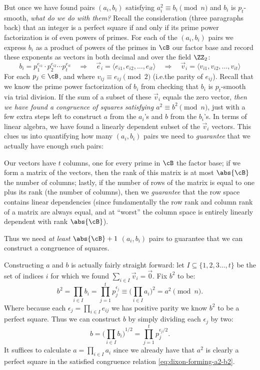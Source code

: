 \documentclass{report}
\begin{document}
But once we have found pairs $(a_i,b_i)$ satisfying $a_i^2\equiv b_i\pmod n$ and $b_i$ is
$p_t$-smooth, \emph{what do we do with them?} Recall the consideration (three paragraphs back) that
an integer is a perfect square if and only if its prime power factorization is of even powers of
primes. For each of the $(a_i,b_i)$ pairs we express $b_i$ as a product of powers of the primes in
$\cB$ our factor base and record these exponents as vectors in both decimal and over the field
$\ZZ_2$:
\begin{equation}
    b_i = p_1^{e_{i1}}\cdot p_2^{e_{i2}}\cdots p_t^{e_{it}}
    \quad\Rightarrow\quad
    \vec e_i = \langle e_{i1},e_{i2},\ldots,e_{it}\rangle
    \quad\Rightarrow\quad
    \vec v_i = \langle v_{i1},v_{i2},\ldots,v_{it} \rangle
\end{equation}
For each $p_j\in\cB$, and where $v_{ij}\equiv e_{ij}\pmod 2$ (i.e.\@ the parity of $e_{ij}$).
Recall that we know the prime power factorization of $b_i$ from checking that $b_i$ is $p_t$-smooth
via trial division. If the sum of a subset of these $\vec v_i$ equals the zero vector, \emph{then we
have found a congruence of squares satisfying $a^2\equiv b^2\pmod n$}, just with a few extra steps
left to construct $a$ from the $a_i$'s and $b$ from the $b_i$'s. In terms of linear algebra, we have
found a linearly dependent subset of the $\vec v_i$ vectors. This clues us into quantifying how many
$(a_i,b_i)$ pairs we need to \emph{guarantee} that we actually have enough such pairs:

\noindent
Our vectors have $t$ columns, one for every prime in $\cB$ the factor base; if we form a matrix of
the vectors, then the rank of this matrix is at most $\abs{\cB}$ the number of columns; lastly, if
the number of rows of the matrix is equal to one plus its rank (the number of columns), then we
\emph{guarantee} that the row space contains linear dependencies (since fundamentally the row rank
and column rank of a matrix are always equal, and at ``worst'' the column space is entirely linearly
dependent with rank $\abs{\cB}$).

\noindent
Thus we need \emph{at least} $\abs{\cB}+1$ $(a_i,b_i)$ pairs to guarantee that we can construct a
congruence of squares.

Constructing $a$ and $b$ is actually fairly straight forward:
let $I\subseteq\{1,2,3\ldots,t\}$ be the set of indices $i$ for which we found
$\sum_{i\in I}\vec v_i = \vec 0$.
Fix $b^2$ to be:
\begin{equation}\label{eq:dixon-forming-a2-b2}
    b^2 = \prod_{i\in I} b_i = \prod_{j=1}^t p_j^{\epsilon_j}
    \equiv \Big(\prod_{i\in I}a_i\Big)^2 = a^2 \pmod n.
\end{equation}
Where because each $\epsilon_j = \prod_{i\in I} e_{ij}$ we has positive parity we know $b^2$ to be a
perfect square. Thus we can construct $b$ by simply dividing each $\epsilon_j$ by two:
\begin{equation}
    b = {\Big(\prod_{i\in I} b_i\Big)}^{1/2} = \prod_{j=1}^t p_j^{\epsilon_j/2}.
\end{equation}
It suffices to calculate $a=\prod_{i\in I}a_i$ since we already have that $a^2$ is clearly a perfect
square in the satisfied congruence relation \cref{eq:dixon-forming-a2-b2}.
\end{document}
